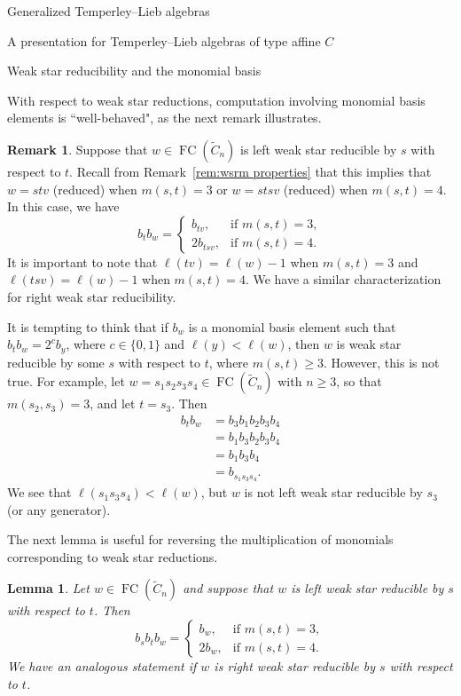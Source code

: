 \documentclass[11pt]{amsart}
\newtheorem{lemma}[theorem]{Lemma}
\theoremstyle{definition}
\newtheorem{remark}[theorem]{Remark}
\numberwithin{equation}{section}
\newcommand{\C}{\widetilde{C}}
\renewcommand{\(}{\left(}
\renewcommand{\)}{\right)}
\DeclareMathOperator{\FC}{FC}
\begin{document}
\begin{section}{Generalized Temperley--Lieb algebras}
\begin{subsection}{A presentation for Temperley--Lieb algebras of type affine $C$}
\end{subsection}


\begin{subsection}{Weak star reducibility and the monomial basis}

With respect to weak star reductions, computation involving monomial basis elements is ``well-behaved", as the next remark illustrates.

\begin{remark}\label{rem:monomial weak star reductions}
Suppose that $w \in \FC(\C_{n})$ is left weak star reducible by $s$ with respect to $t$.  Recall from Remark~\ref{rem:wsrm properties} that this implies that $w=stv$ (reduced) when $m(s,t)=3$ or $w=stsv$ (reduced) when $m(s,t)=4$.  In this case, we have
\[
b_{t}b_{w}=\begin{cases}
b_{tv},   & \text{if } m(s,t)=3, \\
2b_{tsv},   & \text{if } m(s,t)=4.
\end{cases}
\]
It is important to note that $\ell(tv)=\ell(w)-1$ when $m(s,t)=3$ and $\ell(tsv)=\ell(w)-1$ when $m(s,t)=4$.  We have a similar characterization for right weak star reducibility.  
\end{remark}

It is tempting to think that if $b_{w}$ is a monomial basis element such that $b_{t}b_{w}=2^{c}b_{y}$, where $c\in \{0,1\}$ and $\ell(y)<\ell(w)$, then $w$ is weak star reducible by some $s$ with respect to $t$, where $m(s,t)\geq 3$.  However, this is not true.  For example, let $w=s_{1}s_{2}s_{3}s_{4} \in \FC(\C_{n})$ with $n \geq 3$, so that $m(s_{2},s_{3})=3$, and let $t=s_{3}$.  Then
{\allowdisplaybreaks
\begin{align*}
b_{t}b_{w} &= b_{3}b_{1}b_{2}b_{3}b_{4} \\
&= b_{1}b_{3}b_{2}b_{3}b_{4}\\
&= b_{1}b_{3}b_{4} \\
&= b_{s_{1}s_{3}s_{4}}.
\end{align*}}%
We see that $\ell(s_{1}s_{3}s_{4}) < \ell(w)$, but $w$ is not left weak star reducible by $s_{3}$ (or any generator).  

The next lemma is useful for reversing the multiplication of monomials corresponding to weak star reductions.

\begin{lemma}\label{lem:weak star reverse}
Let $w \in \FC(\C_{n})$ and suppose that $w$ is left weak star reducible by $s$ with respect to $t$.  Then
\[
b_{s}b_{t}b_{w}=\begin{cases}
b_{w},   & \text{if } m(s,t)=3, \\
2b_{w},   & \text{if } m(s,t)=4.
\end{cases}
\]
We have an analogous statement if $w$ is right weak star reducible by $s$ with respect to $t$.
\end{lemma}


\end{subsection}
\end{section}
\end{document}
